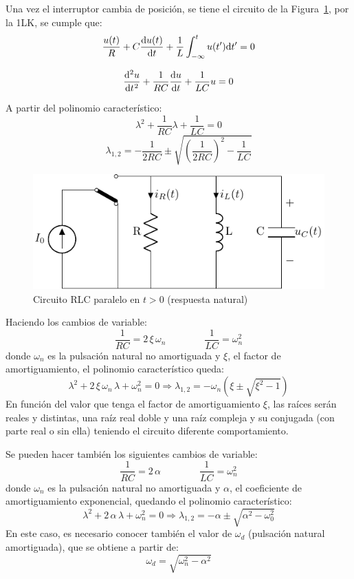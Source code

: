 Una vez el interruptor cambia de posición, se tiene el circuito de la
Figura~\ref{fig:transitorio_paralelo_t0+}, por la 1LK, se cumple que:
\[
  \dfrac{u(t)}{R} + C\diff{u(t)}{t} + \frac{1}{L}\int_{-\infty}^t
  u(t') \mathrm{d}t' = 0
\]

\[
  \diff[2]{u}{t} + \frac{1}{RC} \diff{u}{t} + \frac{1}{LC} u = 0
\]

A partir del polinomio característico:
\[
  \lambda^2 + \frac{1}{RC} \lambda + \frac{1}{LC} = 0
\]
\[
  \lambda_{1,2} = -\frac{1}{2RC} \pm
  \sqrt{\left(\frac{1}{2RC}\right)^2 - \frac{1}{LC}}
\]
\begin{figure}[H]
  \centering
  \includegraphics{../figs/transitorio_circuitoRLC_paralelo_t0+.pdf}
  \caption{Circuito RLC paralelo en $t>0$ (respuesta natural)}
  \label{fig:transitorio_paralelo_t0+}
\end{figure}

Haciendo los cambios de variable:
\begin{equation*} {\dfrac{1}{RC}=2\,\xi\,\omega_n}\qquad \qquad
  {\dfrac{1}{LC}=\omega_n^2}
\end{equation*}
donde $\omega_n$ es la pulsación natural no amortiguada y $\xi$, el
factor de amortiguamiento, el polinomio característico queda:
\begin{equation*}
  \lambda^2+2\,\xi\,\omega_n\,\lambda + \omega_n^2=0 \Rightarrow \lambda_{1,2}=-\omega_n\left(\xi\pm\sqrt{\xi^2-1}\right)
\end{equation*}
En función del valor que tenga el factor de amortiguamiento $\xi$, las
raíces serán reales y distintas, una raíz real doble y una raíz
compleja y su conjugada (con parte real o sin ella) teniendo el
circuito diferente comportamiento.
	
\begin{remark}
  Se pueden hacer también los siguientes cambios de variable:
  \begin{equation*} {\dfrac{1}{RC}=2\,\alpha}\qquad \qquad
    {\dfrac{1}{LC}=\omega_n^2}
  \end{equation*}
  donde $\omega_n$ es la pulsación natural no amortiguada y $\alpha$,
  el coeficiente de amortiguamiento exponencial, quedando el polinomio
  característico:
  \begin{equation*}
    \lambda^2+2\,\alpha\,\lambda + \omega_n^2=0 \Rightarrow \lambda_{1,2}=-\alpha \pm \sqrt{\alpha^2 - \omega_0^2}
  \end{equation*}
  En este caso, es necesario conocer también el valor de $\omega_d$
  (pulsación natural amortiguada), que se obtiene a partir de:
  \begin{equation*}
    \omega_d=\sqrt{\omega_n^2-\alpha^2}
  \end{equation*}
\end{remark}
	
